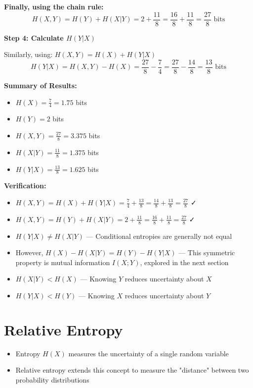 \documentclass[11pt,a4paper]{book}
\newenvironment{infobox}[1][For more understanding]{
    \begin{tcolorbox}[
        enhanced,
        breakable,
        colback=mintgreen!10,
        colframe=mintgreen!200,
        title=#1,
        fonttitle=\bfseries,
        sharp corners,
        boxrule=0.8pt,
        left=8pt,
        right=8pt,
        top=6pt,
        bottom=6pt
    ]
}{
    \end{tcolorbox}
}
\newcounter{qna}[chapter]
\renewcommand{\theqna}{\thechapter.\arabic{qna}}
\newenvironment{questionanswerbox}{
    \refstepcounter{qna}%
    \begin{tcolorbox}[
        enhanced,
        breakable,
        colback=softlavender!10,
        colframe=softlavender!200,
        title={Example~\theqna}, %
        fonttitle=\bfseries,
        coltitle=white,
        colbacktitle=softlavender!200,
        sharp corners,
        boxrule=1pt,
        left=8pt,
        right=8pt,
        top=6pt,
        bottom=6pt
    ]
}{
    \end{tcolorbox}
}
\begin{document}
\begin{questionanswerbox}
    \textbf{Finally, using the chain rule:}
    \[
    H(X,Y) = H(Y) + H(X|Y) = 2 + \frac{11}{8} = \frac{16}{8} + \frac{11}{8} = \frac{27}{8} \text{ bits}
    \]
    
    \textbf{Step 4: Calculate \(H(Y|X)\)}
    
    Similarly, using: \(H(X,Y) = H(X) + H(Y|X)\)
    \[
    H(Y|X) = H(X,Y) - H(X) = \frac{27}{8} - \frac{7}{4} = \frac{27}{8} - \frac{14}{8} = \frac{13}{8} \text{ bits}
    \]
    
    \textbf{Summary of Results:}
    \begin{itemize}
        \item \(H(X) = \frac{7}{4} = 1.75\) bits
        \item \(H(Y) = 2\) bits
        \item \(H(X,Y) = \frac{27}{8} = 3.375\) bits
        \item \(H(X|Y) = \frac{11}{8} = 1.375\) bits
        \item \(H(Y|X) = \frac{13}{8} = 1.625\) bits
    \end{itemize}
    
    \textbf{Verification:}
    \begin{itemize}
        \item \(H(X,Y) = H(X) + H(Y|X) = \frac{7}{4} + \frac{13}{8} = \frac{14}{8} + \frac{13}{8} = \frac{27}{8}\) ✓
        \item \(H(X,Y) = H(Y) + H(X|Y) = 2 + \frac{11}{8} = \frac{16}{8} + \frac{11}{8} = \frac{27}{8}\) ✓
    \end{itemize}
\end{questionanswerbox}

\begin{infobox}[Important Observations]
    \begin{itemize}
        \item \(H(Y|X) \neq H(X|Y)\) — Conditional entropies are generally not equal
        \item However, \(H(X) - H(X|Y) = H(Y) - H(Y|X)\) — This symmetric property is mutual information \(I(X;Y)\), explored in the next section
        \item \(H(X|Y) < H(X)\) — Knowing \(Y\) reduces uncertainty about \(X\)
        \item \(H(Y|X) < H(Y)\) — Knowing \(X\) reduces uncertainty about \(Y\)
    \end{itemize}
\end{infobox}

\section{Relative Entropy}
    \begin{itemize}
        \item Entropy \(H(X)\) measures the uncertainty of a single random variable
        \item Relative entropy extends this concept to measure the "distance" between two probability distributions
    \end{itemize}
\end{document}
